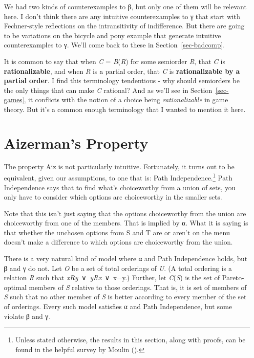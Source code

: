 \documentclass[
  11pt,
  letterpaper,
  DIV=11,
  numbers=noendperiod,
  twoside]{scrartcl}
\begin{document}
We had two kinds of counterexamples to β, but only one of them will be
relevant here. I don't think there are any intuitive counterexamples to
γ that start with Fechner-style reflections on the intransitivity of
indifference. But there are going to be variations on the bicycle and
pony example that generate intuitive counterexamples to γ. We'll come
back to these in Section~\ref{sec-badcomp}.

It is common to say that when \emph{C} = \emph{B}(\emph{R}) for some
semiorder \emph{R}, that \emph{C} is \textbf{rationalizable}, and when
\emph{R} is a partial order, that \emph{C} is \textbf{rationalizable by
a partial order}. I find this terminology tendentious - why should
semiorders be the only things that can make \emph{C} rational? And as
we'll see in Section~\ref{sec-games}, it conflicts with the notion of a
choice being \emph{rationalizable} in game theory. But it's a common
enough terminology that I wanted to mention it here.

\section{Aizerman's Property}\label{sec-aiz}

The property Aiz is not particularly intuitive. Fortunately, it turns
out to be equivalent, given our assumptions, to one that is: Path
Independence.\footnote{Unless stated otherwise, the results in this
  section, along with proofs, can be found in the helpful survey by
  Moulin ().} Path Independence says that
to find what's choiceworthy from a union of sets, you only have to
consider which options are choiceworthy in the smaller sets.

Note that this isn't just saying that the options choiceworthy from the
union are choiceworthy from one of the members. That is implied by α.
What it is saying is that whether the unchosen options from S and T are
or aren't on the menu doesn't make a difference to which options are
choiceworthy from the union.

There is a very natural kind of model where α and Path Independence
holds, but β and γ do not. Let \emph{O} be a set of total orderings of
\emph{U}. (A total ordering is a relation \emph{R} such that
\emph{xRy}~∨~\emph{yRx}~∨~x=y.) Further, let \emph{C}(\emph{S}) is the
set of Pareto-optimal members of \emph{S} relative to those orderings.
That is, it is set of members of \emph{S} such that no other member of
\emph{S} is better according to every member of the set of orderings.
Every such model satisfies α and Path Independence, but some violate β
and γ.
\end{document}
